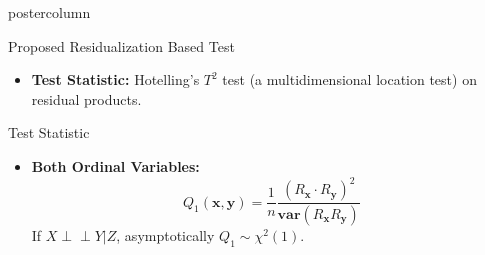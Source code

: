 \documentclass{beamer}
\def\ci{\perp\!\!\!\!\!\perp}
\begin{document}
\begin{frame}
\begin{columns}
\begin{column}{.33\textwidth}
\begin{beamercolorbox}[center]{postercolumn}
\begin{minipage}{.98\textwidth}
{\begin{myblock}{Proposed Residualization Based Test}
\begin{itemize}
				For the conditional case for sample $ (y|z)_i $,
				$$ R_{y_i | z_i} = \hat{p}(Y < y_i | Z=z_i) - \hat{p}(Y>y_i|Z=z_i) $$
			\item \textbf{Test Statistic:} Hotelling's $ T^2 $ test
				(a multidimensional location test) on residual
				products.
		\end{itemize}
	\end{myblock}\vfill
	\begin{myblock}{Test Statistic}
		\begin{itemize}
			\setlength\itemsep{0.5em}
			\item \textbf{Both Ordinal Variables:}
			$$ Q_1(\bm{x}, \bm{y}) = \frac{1}{n} \frac{(R_{\bm{x}} \cdot R_{\bm{y}})^2}{\bm{var}(R_{\bm{x}} R_{\bm{y}})} $$
			If $ X \ci Y | Z $, asymptotically $ Q_1 \sim \chi^2(1) $.
		\end{itemize}
	\end{myblock}\vfill
		}\end{minipage}\end{beamercolorbox}
	\end{column}



\end{columns}
\end{frame}
\end{document}
